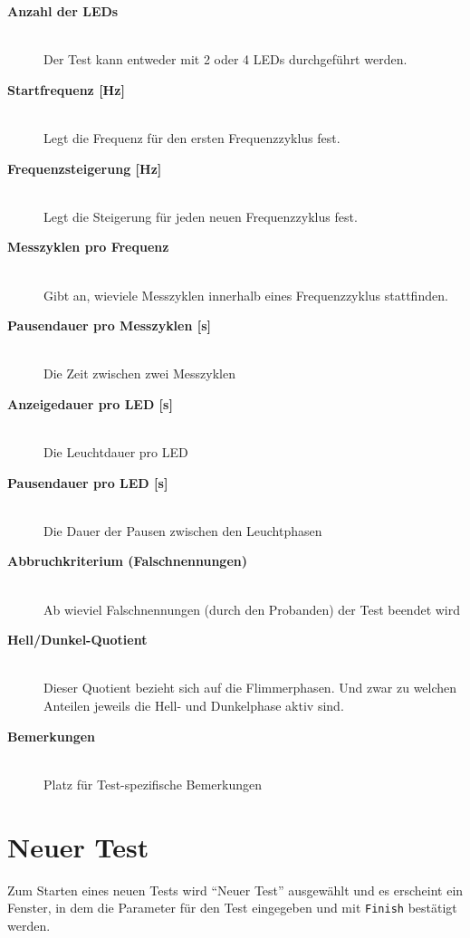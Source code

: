 \documentclass[11pt,accentcolor=tud2a,colorback,noheadingspace,bigchapter]{tudreport}
\begin{document}
\begin{description}
\item[{\textbf{Anzahl der LEDs}}] \hfill \\
Der Test kann entweder mit 2 oder 4 LEDs durchgeführt werden.

\item[{\textbf{Startfrequenz {[}Hz{]}}}] \hfill \\
Legt die Frequenz für den ersten Frequenzzyklus fest.

\item[{\textbf{Frequenzsteigerung {[}Hz{]}}}] \hfill \\
Legt die Steigerung für jeden neuen Frequenzzyklus fest.

\item[{\textbf{Messzyklen pro Frequenz}}] \hfill \\
Gibt an, wieviele Messzyklen innerhalb eines Frequenzzyklus stattfinden.

\item[{\textbf{Pausendauer pro Messzyklen {[}s{]}}}] \hfill \\
Die Zeit zwischen zwei Messzyklen

\item[{\textbf{Anzeigedauer pro LED {[}s{]}}}] \hfill \\
Die Leuchtdauer pro LED

\item[{\textbf{Pausendauer pro LED {[}s{]}}}] \hfill \\
Die Dauer der Pausen zwischen den Leuchtphasen

\item[{\textbf{Abbruchkriterium (Falschnennungen)}}] \hfill \\
Ab wieviel Falschnennungen (durch den Probanden) der Test beendet wird

\item[{\textbf{Hell/Dunkel-Quotient}}] \hfill \\
Dieser Quotient bezieht sich auf die Flimmerphasen. Und zwar zu welchen Anteilen jeweils die Hell- und Dunkelphase aktiv sind.

\item[{\textbf{Bemerkungen}}] \hfill \\
Platz für Test-spezifische Bemerkungen

\end{description}


\section{Neuer Test}
\label{tests:neuer-test}\label{tests:test-new}
Zum Starten eines neuen Tests wird ``Neuer Test'' ausgewählt und es erscheint ein Fenster, in dem die Parameter für den Test eingegeben und mit \texttt{Finish} bestätigt werden.
\end{document}
